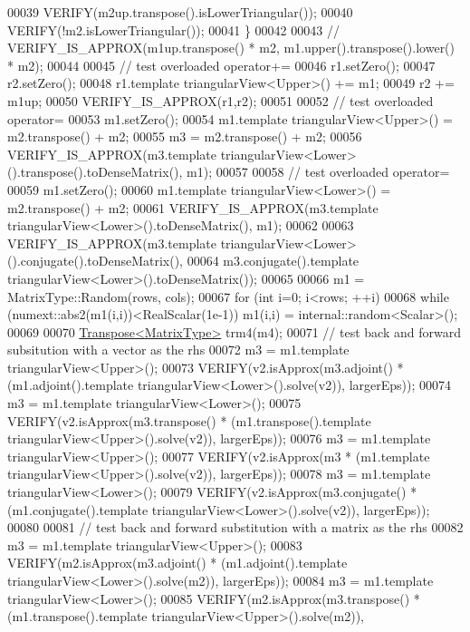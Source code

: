 \begin{DoxyCode}
00039     VERIFY(m2up.transpose().isLowerTriangular());
00040     VERIFY(!m2.isLowerTriangular());
00041   \}
00042 
00043 \textcolor{comment}{//   VERIFY\_IS\_APPROX(m1up.transpose() * m2, m1.upper().transpose().lower() * m2);}
00044 
00045   \textcolor{comment}{// test overloaded operator+=}
00046   r1.setZero();
00047   r2.setZero();
00048   r1.template triangularView<Upper>() +=  m1;
00049   r2 += m1up;
00050   VERIFY\_IS\_APPROX(r1,r2);
00051 
00052   \textcolor{comment}{// test overloaded operator=}
00053   m1.setZero();
00054   m1.template triangularView<Upper>() = m2.transpose() + m2;
00055   m3 = m2.transpose() + m2;
00056   VERIFY\_IS\_APPROX(m3.template triangularView<Lower>().transpose().toDenseMatrix(), m1);
00057 
00058   \textcolor{comment}{// test overloaded operator=}
00059   m1.setZero();
00060   m1.template triangularView<Lower>() = m2.transpose() + m2;
00061   VERIFY\_IS\_APPROX(m3.template triangularView<Lower>().toDenseMatrix(), m1);
00062 
00063   VERIFY\_IS\_APPROX(m3.template triangularView<Lower>().conjugate().toDenseMatrix(),
00064                    m3.conjugate().template triangularView<Lower>().toDenseMatrix());
00065 
00066   m1 = MatrixType::Random(rows, cols);
00067   \textcolor{keywordflow}{for} (\textcolor{keywordtype}{int} i=0; i<rows; ++i)
00068     \textcolor{keywordflow}{while} (numext::abs2(m1(i,i))<RealScalar(1e-1)) m1(i,i) = internal::random<Scalar>();
00069 
00070   \hyperlink{group___core___module_class_eigen_1_1_transpose}{Transpose<MatrixType>} trm4(m4);
00071   \textcolor{comment}{// test back and forward subsitution with a vector as the rhs}
00072   m3 = m1.template triangularView<Upper>();
00073   VERIFY(v2.isApprox(m3.adjoint() * (m1.adjoint().template triangularView<Lower>().solve(v2)), largerEps));
00074   m3 = m1.template triangularView<Lower>();
00075   VERIFY(v2.isApprox(m3.transpose() * (m1.transpose().template triangularView<Upper>().solve(v2)), 
      largerEps));
00076   m3 = m1.template triangularView<Upper>();
00077   VERIFY(v2.isApprox(m3 * (m1.template triangularView<Upper>().solve(v2)), largerEps));
00078   m3 = m1.template triangularView<Lower>();
00079   VERIFY(v2.isApprox(m3.conjugate() * (m1.conjugate().template triangularView<Lower>().solve(v2)), 
      largerEps));
00080 
00081   \textcolor{comment}{// test back and forward substitution with a matrix as the rhs}
00082   m3 = m1.template triangularView<Upper>();
00083   VERIFY(m2.isApprox(m3.adjoint() * (m1.adjoint().template triangularView<Lower>().solve(m2)), largerEps));
00084   m3 = m1.template triangularView<Lower>();
00085   VERIFY(m2.isApprox(m3.transpose() * (m1.transpose().template triangularView<Upper>().solve(m2)), 

\end{DoxyCode}
